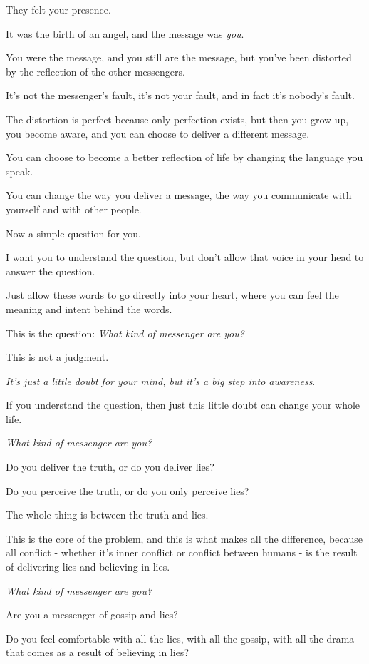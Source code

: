 \documentclass{article}
\numberwithin{equation}{section}
\begin{document}
They felt your presence.

It was the birth of an angel, and the message was \textit{you}.

%
You were the message, and you still are the message, but you've been distorted by the reflection of the other messengers.

It's not the messenger's fault, it's not your fault, and in fact it's nobody's fault.

The distortion is perfect because only perfection exists, but then you grow up, you become aware, and you can choose to deliver a different message.

You can choose to become a better reflection of life by changing the language you speak.

You can change the way you deliver a message, the way you communicate with yourself and with other people.

%
Now a simple question for you.

I want you to understand the question, but don't allow that voice in your head to answer the question.

Just allow these words to go directly into your heart, where you can feel the meaning and intent behind the words.

This is the question: \textit{What kind of messenger are you?}

This is not a judgment.

\textit{It's just a little doubt for your mind, but it's a big step into awareness}.

If you understand the question, then just this little doubt can change your whole life.

%
\textit{What kind of messenger are you?}

Do you deliver the truth, or do you deliver lies?

Do you perceive the truth, or do you only perceive lies?

The whole thing is between the truth and lies.

This is the core of the problem, and this is what makes all the difference, because all conflict - whether it's inner conflict or conflict between humans - is the result of delivering lies and believing in lies.

%
\textit{What kind of messenger are you?}

Are you a messenger of gossip and lies?

Do you feel comfortable with all the lies, with all the gossip, with all the drama that comes as a result of believing in lies?
\end{document}
